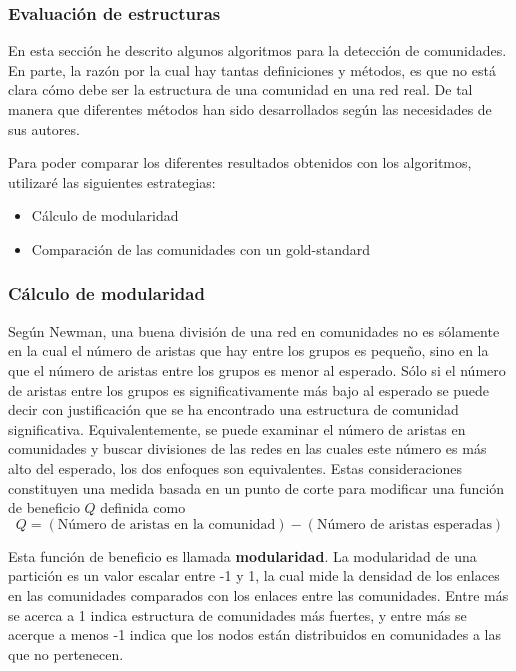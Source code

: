 \subsubsection{Evaluación de estructuras}
En esta sección he descrito algunos algoritmos para la detección de comunidades. En parte, la razón por la cual hay tantas definiciones y métodos, es que no está clara cómo debe ser la estructura de una comunidad en una red real. De tal manera que diferentes métodos han sido desarrollados según las necesidades de sus autores\cite{Tang2010}.

Para poder comparar los diferentes resultados obtenidos con los algoritmos, utilizaré las siguientes estrategias:

\begin{itemize}
\item Cálculo de modularidad
\item Comparación de las comunidades con un gold-standard 
\end{itemize}

\subsubsection{Cálculo de modularidad}
 
Según Newman\cite{Newman2006FindingMatrices.}, una buena división de una red en comunidades no es sólamente en la cual el número de aristas que hay entre los grupos es pequeño, sino en la que el número de aristas entre los grupos es menor al esperado. Sólo si el número de aristas entre los grupos es significativamente más bajo al esperado se puede decir con justificación que se ha encontrado una estructura de comunidad significativa. Equivalentemente, se puede examinar el número de aristas en comunidades y buscar divisiones de las redes en las cuales este número es más alto del esperado, los dos enfoques son equivalentes. Estas consideraciones constituyen una medida basada en un punto de corte para modificar una función de beneficio $Q$ definida como
\begin{equation}
Q =  (\text{Número de aristas en la comunidad}) -  (\text{Número de aristas esperadas})
\end{equation} 

Esta función de beneficio es llamada \textbf{modularidad}. La modularidad de una partición es un valor escalar entre -1 y 1, la cual mide la densidad de los enlaces en las comunidades comparados con los enlaces entre las comunidades\cite{Blondel2008FastNetworks}. Entre más se acerca a 1 indica estructura de comunidades más fuertes, y entre más se acerque a menos -1 indica que los nodos están distribuidos en comunidades a las que no pertenecen\cite{Tang2010}.

